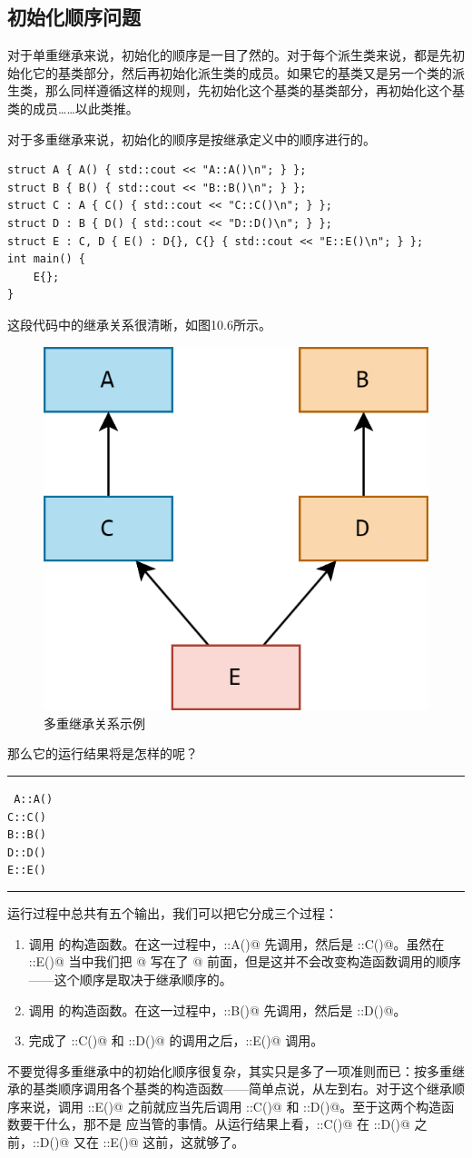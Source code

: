 \subsection*{初始化顺序问题}
对于单重继承来说，初始化的顺序是一目了然的。对于每个派生类来说，都是先初始化它的基类部分，然后再初始化派生类的成员。如果它的基类又是另一个类的派生类，那么同样遵循这样的规则，先初始化这个基类的基类部分，再初始化这个基类的成员……以此类推。\par
对于多重继承来说，初始化的顺序是按继承定义中的顺序进行的。
\begin{lstlisting}
struct A { A() { std::cout << "A::A()\n"; } };
struct B { B() { std::cout << "B::B()\n"; } };
struct C : A { C() { std::cout << "C::C()\n"; } };
struct D : B { D() { std::cout << "D::D()\n"; } };
struct E : C, D { E() : D{}, C{} { std::cout << "E::E()\n"; } };
int main() {
    E{};
}
\end{lstlisting}
这段代码中的继承关系很清晰，如图10.6所示。
\begin{figure}[htbp]
    \centering
    \includegraphics[width=.36\textwidth]{../images/generalized_parts/10_multiple_inheritance_example.drawio.png}
    \caption{多重继承关系示例}
\end{figure}
那么它的运行结果将是怎样的呢？\\\noindent\rule{\linewidth}{.2pt}\texttt{
A::A()\\
C::C()\\
B::B()\\
D::D()\\
E::E()
}\\\noindent\rule{\linewidth}{.2pt}
运行过程中总共有五个输出，我们可以把它分成三个过程：
\begin{enumerate}
    \item 调用 \lstinline@C@ 的构造函数。在这一过程中，\lstinline@A::A()@ 先调用，然后是 \lstinline@C::C()@。虽然在 \lstinline@E::E()@ 当中我们把 \lstinline@D{}@ 写在了 \lstinline@C{}@ 前面，但是这并不会改变构造函数调用的顺序——这个顺序是取决于继承顺序的。
    \item 调用 \lstinline@D@ 的构造函数。在这一过程中，\lstinline@B::B()@ 先调用，然后是 \lstinline@D::D()@。
    \item 完成了 \lstinline@C::C()@ 和 \lstinline@D::D()@ 的调用之后，\lstinline@E::E()@ 调用。
\end{enumerate}
不要觉得多重继承中的初始化顺序很复杂，其实只是多了一项准则而已：按多重继承的基类顺序调用各个基类的构造函数——简单点说，从左到右。对于这个继承顺序来说，调用 \lstinline@E::E()@ 之前就应当先后调用 \lstinline@C::C()@ 和 \lstinline@D::D()@。至于这两个构造函数要干什么，那不是 \lstinline@E@ 应当管的事情。从运行结果上看，\lstinline@C::C()@ 在 \lstinline@D::D()@ 之前，\lstinline@D::D()@ 又在 \lstinline@E::E()@ 这前，这就够了。\par
